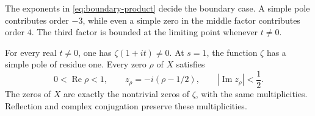 \documentclass[11pt]{article}
\numberwithin{equation}{section}
\begin{document}
The exponents in \eqref{eq:boundary-product} decide the boundary case.
A simple pole contributes order $-3$, while even a simple zero in the
middle factor contributes order $4$.
The third factor is bounded at the limiting point whenever $t\ne0$.

\begin{theorem}
\label{thm:strict-strip}
For every real $t\ne0$, one has $\zeta(1+it)\ne0$.
At $s=1$, the function $\zeta$ has a simple pole of residue one.
Every zero $\rho$ of $X$ satisfies
\begin{equation}
 0<\operatorname{Re}\rho<1,
 \qquad
 z_\rho=-i(\rho-1/2),
 \qquad
 |\operatorname{Im}z_\rho|<\frac12.
 \label{eq:strict-strip}
\end{equation}
The zeros of $X$ are exactly the nontrivial zeros of $\zeta$, with
the same multiplicities.
Reflection and complex conjugation preserve these multiplicities.
\end{theorem}
\end{document}
